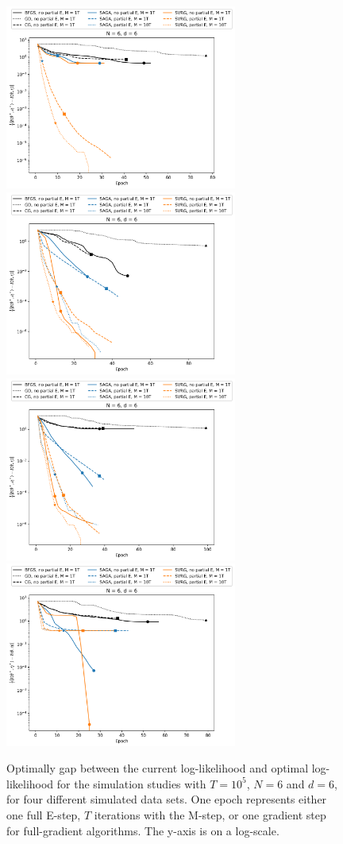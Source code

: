 \documentclass{article}
\begin{document}
%
\begin{figure}
    \centering
    \includegraphics[width=3in]{../plt/log-like_v_epoch_T-100000-K-6-1-d-6-001.png}
    \includegraphics[width=3in]{../plt/log-like_v_epoch_T-100000-K-6-1-d-6-002.png}
    \\
    \includegraphics[width=3in]{../plt/log-like_v_epoch_T-100000-K-6-1-d-6-003.png}
    \includegraphics[width=3in]{../plt/log-like_v_epoch_T-100000-K-6-1-d-6-004.png}   
    \caption{Optimally gap between the current log-likelihood and optimal log-likelihood for the simulation studies with $T=10^{5}$, $N=6$ and $d=6$, for four different simulated data sets. One epoch represents either one full E-step, $T$ iterations with the M-step, or one gradient step for full-gradient algorithms. The y-axis is on a log-scale.}
\end{figure}
\end{document}
